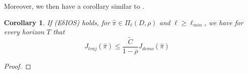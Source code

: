 \documentclass[final]{l4dc2026}
\newcommand{\f}[2]{\frac{#1}{#2}}
\newtheorem{corollary}{Corollary}
\begin{document}
Moreover, we then have a corollary similar to \cite{zhang2025chunking}.
\begin{corollary}
    If (E$\delta$IOS) holds, for $\hat\pi \in \Pi_\ell(D, \rho)$ and $\ell \ge \ell_{min}$, we have for every horizon $T$ that \[J_{traj}(\hat\pi) \le \f{\tilde{C}}{1 - \bar\rho}J_{demo}(\hat\pi)\]
\end{corollary}
\begin{proof}
    
\end{proof}


\end{document}
